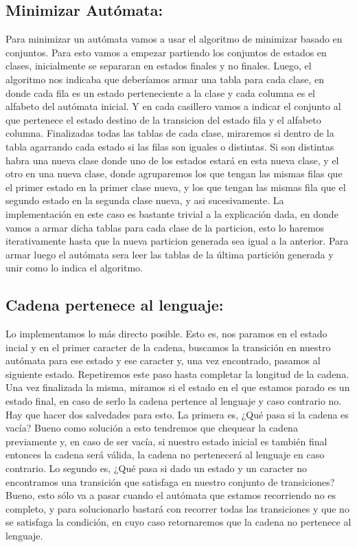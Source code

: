 \subsection{Minimizar Autómata:}
Para minimizar un autómata vamos a usar el algoritmo de minimizar basado en conjuntos. Para esto vamos a empezar partiendo los conjuntos de estados en clases, inicialmente se separaran en estados finales y no finales.\newline
Luego, el algoritmo nos indicaba que deberíamos armar una tabla para cada clase, en donde cada fila es un estado perteneciente a la clase y cada columna es el alfabeto del autómata inicial. Y en cada casillero vamos a indicar el conjunto al que pertenece el estado destino de la transicion del estado fila y el alfabeto columna.\newline
Finalizadas todas las tablas de cada clase, miraremos si dentro de la tabla agarrando cada estado si las filas son iguales o distintas. Si son distintas habra una nueva clase donde uno de los estados estará en esta nueva clase, y el otro en una nueva clase, donde agruparemos los que tengan las mismas filas que el primer estado en la primer clase nueva, y los que tengan las mismas fila que el segundo estado en la segunda clase nueva, y asi sucesivamente.\newline
La implementación en este caso es bastante trivial a la explicación dada, en donde vamos a armar dicha tablas para cada clase de la particion, esto lo haremos iterativamente hasta que la nueva particion generada sea igual a la anterior. Para armar luego el autómata sera leer las tablas de la última partición generada y unir como lo indica el algoritmo.

\subsection{Cadena pertenece al lenguaje:}
Lo implementamos lo más directo posible. Esto es, nos paramos en el estado incial y en el primer caracter de la cadena, buscamos la transición en nuestro autómata para ese estado y ese caracter y, una vez encontrado, pasamos al siguiente estado. Repetiremos este paso hasta completar la longitud de la cadena. Una vez finalizada la misma, miramos si el estado en el que estamos parado es un estado final, en caso de serlo la cadena pertence al lenguaje y caso contrario no.\newline
Hay que hacer dos salvedades para esto. La primera es, ¿Qué pasa si la cadena es vacía? Bueno como solución a esto tendremos que chequear la cadena previamente y, en caso de ser vacía, si nuestro estado inicial es también final entonces la cadena será válida, la cadena no pertenecerá al lenguaje en caso contrario. Lo segundo es, ¿Qué pasa si dado un estado y un caracter no encontramos una transición que satisfaga en nuestro conjunto de transiciones? Bueno, esto sólo va a pasar cuando el autómata que estamos recorriendo no es completo, y para solucionarlo bastará con recorrer todas las transiciones y que no se satisfaga la condición, en cuyo caso retornaremos que la cadena no pertenece al lenguaje.

